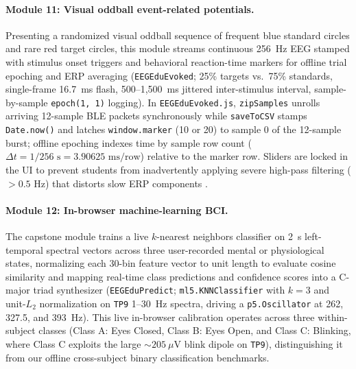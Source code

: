 \documentclass[11pt,letterpaper]{article}
\begin{document}
\paragraph{Module 11: Visual oddball event-related potentials.} Presenting a randomized visual oddball sequence of frequent blue standard circles and rare red target circles, this module streams continuous 256~Hz EEG stamped with stimulus onset triggers and behavioral reaction-time markers for offline trial epoching and ERP averaging (\texttt{EEGEduEvoked}; 25\% targets vs.\ 75\% standards, single-frame 16.7~ms flash, 500--1,500~ms jittered inter-stimulus interval, sample-by-sample \texttt{epoch(1, 1)} logging). In \texttt{EEGEduEvoked.js}, \texttt{zipSamples} unrolls arriving 12-sample BLE packets synchronously while \texttt{saveToCSV} stamps \texttt{Date.now()} and latches \texttt{window.marker} (10 or 20) to sample 0 of the 12-sample burst; offline epoching indexes time by sample row count ($\Delta t = 1/256\text{ s} = 3.90625\text{ ms/row}$) relative to the marker row. Sliders are locked in the UI to prevent students from inadvertently applying severe high-pass filtering ($>0.5\text{ Hz}$) that distorts slow ERP components \citep{tanner2015,luck2014introduction}.

\paragraph{Module 12: In-browser machine-learning BCI.} The capstone module trains a live $k$-nearest neighbors classifier on 2~s left-temporal spectral vectors across three user-recorded mental or physiological states, normalizing each 30-bin feature vector to unit length to evaluate cosine similarity and mapping real-time class predictions and confidence scores into a C-major triad synthesizer (\texttt{EEGEduPredict}; \texttt{ml5.KNNClassifier} with $k = 3$ and unit-$L_2$ normalization on \texttt{TP9} 1--30~Hz spectra, driving a \texttt{p5.Oscillator} at 262, 327.5, and 393~Hz). This live in-browser calibration operates across three within-subject classes (Class A: Eyes Closed, Class B: Eyes Open, and Class C: Blinking, where Class C exploits the large $\sim 205\ \mu\text{V}$ blink dipole on \texttt{TP9}), distinguishing it from our offline cross-subject binary classification benchmarks.
\end{document}
